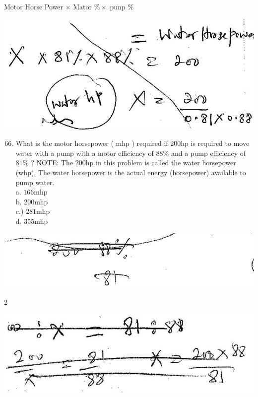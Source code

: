 \documentclass[10pt]{article}
\begin{document}
Motor Horse Power $\times$ Mator $\% \times$ punp $\%$

\includegraphics[max width=\textwidth]{2022_11_11_ca6a6c1a0324ee23e523g-62}

\begin{enumerate}
  \setcounter{enumi}{65}
  \item What is the motor horsepower ( $\mathrm{mhp}$ ) required if $200 \mathrm{hp}$ is required to move water with a pump with a motor efficiency of $88 \%$ and a pump efficiency of $81 \%$ ? NOTE: The $200 \mathrm{hp}$ in this problem is called the water horsepower (whp). The water horsepower is the actual energy (horsepower) available to pump water.\\
a. $166 \mathrm{mhp}$\\
b. $200 \mathrm{mhp}$\\
c.) $281 \mathrm{mhp}$\\
d. $355 \mathrm{mhp}$
\end{enumerate}

\includegraphics[max width=\textwidth]{2022_11_11_ca6a6c1a0324ee23e523g-62(1)}

2

\includegraphics[max width=\textwidth]{2022_11_11_ca6a6c1a0324ee23e523g-62(2)}
\end{document}
